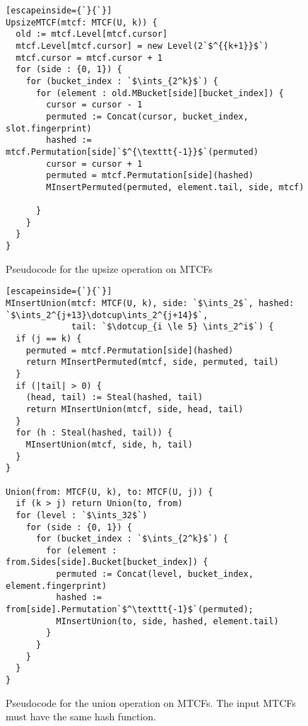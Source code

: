 \documentclass[manuscript,screen,review]{acmart}
\newcommand{\ints}{\mathbb{Z}}
\newcommand{\dotcup}{\ensuremath{\mathaccent\cdot\cup}}
\begin{document}
\begin{figure}
\begin{lstlisting}[escapeinside={`}{`}]
UpsizeMTCF(mtcf: MTCF(U, k)) {
  old := mtcf.Level[mtcf.cursor]
  mtcf.Level[mtcf.cursor] = new Level(2`$^{{k+1}}$`)
  mtcf.cursor = mtcf.cursor + 1
  for (side : {0, 1}) {
    for (bucket_index : `$\ints_{2^k}$`) {
      for (element : old.MBucket[side][bucket_index]) {
        cursor = cursor - 1
        permuted := Concat(cursor, bucket_index, slot.fingerprint)
        hashed := mtcf.Permutation[side]`$^{\texttt{-1}}$`(permuted)
        cursor = cursor + 1
        permuted = mtcf.Permutation[side](hashed)
        MInsertPermuted(permuted, element.tail, side, mtcf)

      }
    }
  }
}
\end{lstlisting}
\caption{Pseudocode for the upsize operation on MTCFs}
\end{figure}

\begin{figure}
\begin{lstlisting}[escapeinside={`}{`}]
MInsertUnion(mtcf: MTCF(U, k), side: `$\ints_2$`, hashed: `$\ints_2^{j+13}\dotcup\ints_2^{j+14}$`,
             tail: `$\dotcup_{i \le 5} \ints_2^i$`) {
  if (j == k) {
    permuted = mtcf.Permutation[side](hashed)
    return MInsertPermuted(mtcf, side, permuted, tail)
  }
  if (|tail| > 0) {
    (head, tail) := Steal(hashed, tail)
    return MInsertUnion(mtcf, side, head, tail)
  }
  for (h : Steal(hashed, tail)) {
    MInsertUnion(mtcf, side, h, tail)
  }
}

Union(from: MTCF(U, k), to: MTCF(U, j)) {
  if (k > j) return Union(to, from)
  for (level : `$\ints_32$`)
    for (side : {0, 1}) {
      for (bucket_index : `$\ints_{2^k}$`) {
        for (element : from.Sides[side].Bucket[bucket_index]) {
          permuted := Concat(level, bucket_index, element.fingerprint)
          hashed := from[side].Permutation`$^\texttt{-1}$`(permuted);
          MInsertUnion(to, side, hashed, element.tail)
        }
      }
    }
  }
}

\end{lstlisting}
\caption{Pseudocode for the union operation on MTCFs.
The input MTCFs must have the same hash function.}
\end{figure}
\end{document}
